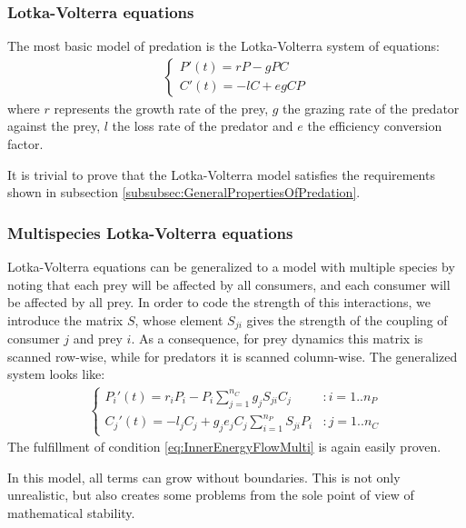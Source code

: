 \subsubsection{Lotka-Volterra equations}
\label{subsubsec:LotkaVolterra}

The most basic model of predation is the Lotka-Volterra system of equations:
%
\begin{eqnarray}
\label{eq:LotkaVolterra}
	\begin{cases}
	P'(t) = r P - g P C
	\\
	C'(t) = - l C + e g C P
	\end{cases}
\end{eqnarray}
%
where $r$ represents the growth rate of the prey, $g$ the grazing rate of the predator against the prey, $l$ the loss rate of the predator and $e$ the efficiency conversion factor.

It is trivial to prove that the Lotka-Volterra model satisfies the requirements shown in subsection \ref{subsubsec:GeneralPropertiesOfPredation}.

\subsubsection{Multispecies Lotka-Volterra equations}
\label{subsubsec:LotkaVolterraMulti}

Lotka-Volterra equations can be generalized to a model with multiple species by noting that each prey will be affected by all consumers, and each consumer will be affected by all prey. In order to code the strength of this interactions, we introduce the matrix $S$, whose element $S_{ji}$ gives the strength of the coupling of consumer $j$ and prey $i$. As a consequence, for prey dynamics this matrix is scanned row-wise, while for predators it is scanned column-wise. The generalized system looks like:
%
\begin{eqnarray}
\label{eq:LotkaVolterraMulti}
	\begin{cases}
	P_i'(t) = r_i P_i - P_i \sum_{j = 1}^{n_C} g_j S_{ji} C_j & : i = 1..n_P
	\\
	C_j'(t) = - l_j C_j +  g_j e_j C_j \sum_{i = 1}^{n_P} S_{ji} P_i  & : j = 1..n_C
	\end{cases}
\end{eqnarray}
%
The fulfillment of condition \ref{eq:InnerEnergyFlowMulti} is again easily proven.

In this model, all terms can grow without boundaries. This is not only unrealistic, but also creates some problems from the sole point of view of mathematical stability.

